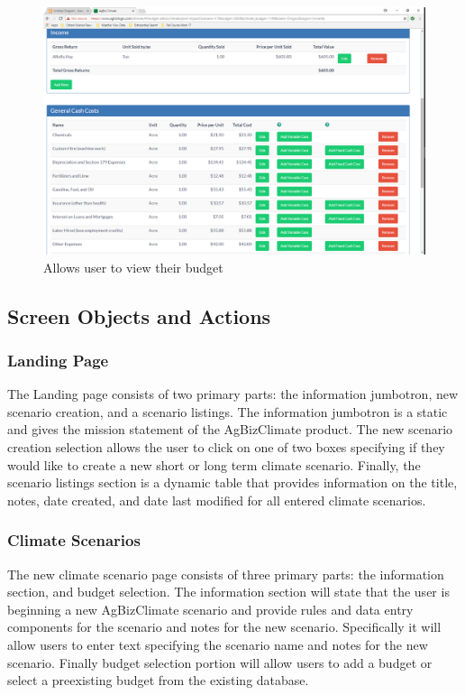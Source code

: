 \documentclass[onecolumn, draftclsnofoot,10pt, compsoc]{article}
\begin{document}
	\clearpage
	\begin{figure}[htb]
		\includegraphics[width=\linewidth]{Figures/BudgetReivew.eps}
		\caption{Allows user to view their budget}
		\label{figure3.5}
	\end{figure}
	\subsection{Screen Objects and Actions}
		\subsubsection{Landing Page}
		The Landing page consists of two primary parts: the information jumbotron, new scenario creation, and a scenario listings. The information jumbotron is a static and gives the mission statement of the AgBizClimate product. The new scenario creation selection allows the user to click on one of two boxes specifying if they would like to create a new short or long term climate scenario. Finally, the scenario listings section is a dynamic table that provides information on the title, notes, date created, and date last modified for all entered climate scenarios.\\
		\subsubsection{Climate Scenarios}
		The new climate scenario page consists of three primary parts: the information section, and budget selection. The information section will state that the user is beginning a new AgBizClimate scenario and provide rules and data entry components for the scenario and notes for the new scenario. Specifically it will allow users to enter text specifying the scenario name and notes for the new scenario. Finally budget selection portion will allow users to add a budget or select a preexisting budget from the existing database.
\end{document}
